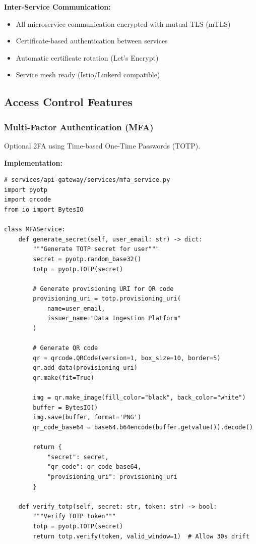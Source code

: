 \textbf{Inter-Service Communication:}
\begin{itemize}
    \item All microservice communication encrypted with mutual TLS (mTLS)
    \item Certificate-based authentication between services
    \item Automatic certificate rotation (Let's Encrypt)
    \item Service mesh ready (Istio/Linkerd compatible)
\end{itemize}

\subsection{Access Control Features}

\subsubsection{Multi-Factor Authentication (MFA)}

Optional 2FA using Time-based One-Time Passwords (TOTP).

\textbf{Implementation:}
\begin{lstlisting}[style=pythonstyle]
# services/api-gateway/services/mfa_service.py
import pyotp
import qrcode
from io import BytesIO

class MFAService:
    def generate_secret(self, user_email: str) -> dict:
        """Generate TOTP secret for user"""
        secret = pyotp.random_base32()
        totp = pyotp.TOTP(secret)
        
        # Generate provisioning URI for QR code
        provisioning_uri = totp.provisioning_uri(
            name=user_email,
            issuer_name="Data Ingestion Platform"
        )
        
        # Generate QR code
        qr = qrcode.QRCode(version=1, box_size=10, border=5)
        qr.add_data(provisioning_uri)
        qr.make(fit=True)
        
        img = qr.make_image(fill_color="black", back_color="white")
        buffer = BytesIO()
        img.save(buffer, format='PNG')
        qr_code_base64 = base64.b64encode(buffer.getvalue()).decode()
        
        return {
            "secret": secret,
            "qr_code": qr_code_base64,
            "provisioning_uri": provisioning_uri
        }
    
    def verify_totp(self, secret: str, token: str) -> bool:
        """Verify TOTP token"""
        totp = pyotp.TOTP(secret)
        return totp.verify(token, valid_window=1)  # Allow 30s drift
\end{lstlisting}


